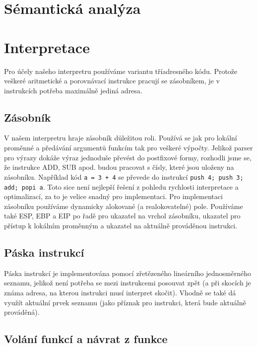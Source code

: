 \documentclass[a4paper,11pt,titlepage]{article}
\begin{document}


\section{Sémantická analýza}

\section{Interpretace}

Pro účely našeho interpretru používáme variantu tříadresného kódu. Pro\-to\-že veškeré aritmetické a porovnávací instrukce pracují se zásobníkem, je v instrukcích potřeba maximálně jediná adresa.

\subsection{Zásobník}

V našem interpretru hraje zásobník důležitou roli. Používá se jak pro lokální proměnné a předávání argumentů funkcím tak pro veškeré výpočty. Jelikož parser pro výrazy dokáže výraz jednoduše převést do postfixové formy, rozhodli jsme se, že instrukce ADD, SUB apod. budou pracovat s čísly, které jsou uloženy na zásobníku. Například kód {\tt a = 3 + 4} se převede do instrukcí {\tt push 4; push 3; add; popi a}. Toto sice není nejlepší řešení z pohledu rychlosti interpretace a optimalizací, za to je velice snadný pro implementaci. Pro implementaci zásobníku používáme dynamicky alokované (a realokovatelné) pole. Používáme také  ESP, EBP a EIP po řadě pro ukazatel na vrchol zásobníku, ukazatel pro přístup k lokálním proměnným a ukazatel na aktuálně prováděnou instrukci.

\subsection{Páska instrukcí}

Páska instrukcí je implementována pomocí zřetězeného lineárního jedno\-směr\-né\-ho seznamu, jelikož není potřeba se mezi instrukcemi posouvat zpět (a při skocích je známa adresa, na kterou instrukci musí interpret skočit). Vhodně se také dá využít aktuální prvek seznamu (jako příznak pro instrukci, která bude aktuálně prováděná).

\subsection{Volání funkcí a návrat z funkce}
\end{document}

